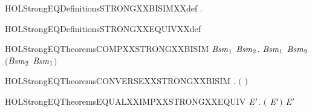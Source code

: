 \newcommand{\HOLStrongEQDate}{12 Dicembre 2019}
\newcommand{\HOLStrongEQTime}{11:58}
\begin{SaveVerbatim}{HOLStrongEQDefinitionsSTRONGXXBISIMXXdef}
\HOLTokenTurnstile{} \HOLSymConst{\HOLTokenForall{}}.   \HOLSymConst{\HOLTokenEquiv{}}   
\end{SaveVerbatim}
\newcommand{\HOLStrongEQDefinitionsSTRONGXXBISIMXXdef}{\UseVerbatim{HOLStrongEQDefinitionsSTRONGXXBISIMXXdef}}
\begin{SaveVerbatim}{HOLStrongEQDefinitionsSTRONGXXEQUIVXXdef}
\HOLTokenTurnstile{}  \HOLSymConst{\ensuremath{=}}  
\end{SaveVerbatim}
\newcommand{\HOLStrongEQDefinitionsSTRONGXXEQUIVXXdef}{\UseVerbatim{HOLStrongEQDefinitionsSTRONGXXEQUIVXXdef}}
\newcommand{\HOLStrongEQDefinitions}{
\HOLDfnTag{StrongEQ}{STRONG_BISIM_def}\HOLStrongEQDefinitionsSTRONGXXBISIMXXdef
\HOLDfnTag{StrongEQ}{STRONG_EQUIV_def}\HOLStrongEQDefinitionsSTRONGXXEQUIVXXdef
}
\begin{SaveVerbatim}{HOLStrongEQTheoremsCOMPXXSTRONGXXBISIM}
\HOLTokenTurnstile{} \HOLSymConst{\HOLTokenForall{}}\ensuremath{\HOLBoundVar{Bsm}\sb{\mathrm{1}}} \ensuremath{\HOLBoundVar{Bsm}\sb{\mathrm{2}}}.
        \ensuremath{\HOLBoundVar{Bsm}\sb{\mathrm{1}}} \HOLSymConst{\HOLTokenConj{}}  \ensuremath{\HOLBoundVar{Bsm}\sb{\mathrm{2}}} \HOLSymConst{\HOLTokenImp{}}
        \ensuremath{(}\ensuremath{\HOLBoundVar{Bsm}\sb{\mathrm{2}}}  \ensuremath{\HOLBoundVar{Bsm}\sb{\mathrm{1}}}\ensuremath{)}
\end{SaveVerbatim}
\newcommand{\HOLStrongEQTheoremsCOMPXXSTRONGXXBISIM}{\UseVerbatim{HOLStrongEQTheoremsCOMPXXSTRONGXXBISIM}}
\begin{SaveVerbatim}{HOLStrongEQTheoremsCONVERSEXXSTRONGXXBISIM}
\HOLTokenTurnstile{} \HOLSymConst{\HOLTokenForall{}}.   \HOLSymConst{\HOLTokenImp{}}  \ensuremath{(} \ensuremath{)}
\end{SaveVerbatim}
\newcommand{\HOLStrongEQTheoremsCONVERSEXXSTRONGXXBISIM}{\UseVerbatim{HOLStrongEQTheoremsCONVERSEXXSTRONGXXBISIM}}
\begin{SaveVerbatim}{HOLStrongEQTheoremsEQUALXXIMPXXSTRONGXXEQUIV}
\HOLTokenTurnstile{} \HOLSymConst{\HOLTokenForall{}} \ensuremath{\HOLBoundVar{E}\sp{\prime}}. \ensuremath{(} \HOLSymConst{\ensuremath{=}} \ensuremath{\HOLBoundVar{E}\sp{\prime}}\ensuremath{)} \HOLSymConst{\HOLTokenImp{}}   \ensuremath{\HOLBoundVar{E}\sp{\prime}}
\end{SaveVerbatim}
